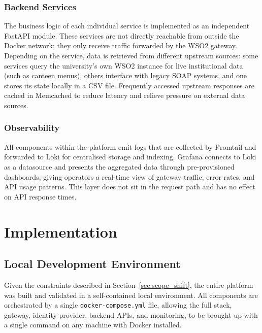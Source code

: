 \documentclass[12pt, a4paper]{report}
\begin{document}
\subsection{Backend Services}
The business logic of each individual service is implemented as an independent FastAPI
module. These services are not directly reachable from outside the Docker network;
they only receive traffic forwarded by the WSO2 gateway. Depending on the service,
data is retrieved from different upstream sources: some services query the university's
own WSO2 instance for live institutional data (such as canteen menus), others interface
with legacy SOAP systems, and one stores its state locally in a CSV file. Frequently
accessed upstream responses are cached in Memcached to reduce latency and relieve
pressure on external data sources.

\subsection{Observability}
All components within the platform emit logs that are collected by Promtail and
forwarded to Loki for centralised storage and indexing. Grafana connects to Loki as
a datasource and presents the aggregated data through pre-provisioned dashboards,
giving operators a real-time view of gateway traffic, error rates, and API usage
patterns. This layer does not sit in the request path and has no effect on API
response times.

\chapter{Implementation}
\label{chap:implementation}

\section{Local Development Environment}
Given the constraints described in Section~\ref{sec:scope_shift}, the entire platform
was built and validated in a self-contained local environment. All components are
orchestrated by a single \texttt{docker-compose.yml} file, allowing the full stack,
gateway, identity provider, backend APIs, and monitoring, to be brought up with a
single command on any machine with Docker installed.
\end{document}
